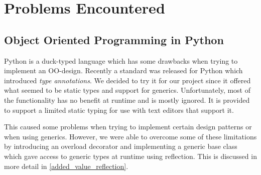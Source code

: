 \chapter{Problems Encountered}

  \section{Object Oriented Programming in Python}
  Python is a duck-typed language which has some drawbacks when trying to implement an OO-design.
  Recently a standard was released for Python which introduced \emph{type annotations}.
  We decided to try it for our project since it offered what seemed to be static types and support
  for generics.
  Unfortunately, most of the functionality has no benefit at runtime and is mostly ignored. It is
  provided to support a limited static typing for use with text editors that support it.

  This caused some problems when trying to implement certain design patterns or when using generics.
  However, we were able to overcome some of these limitations by introducing an overload
  decorator and implementing a generic base class which gave access to generic types at runtime
  using reflection. This is discussed in more detail in \ref{added_value_reflection}.
